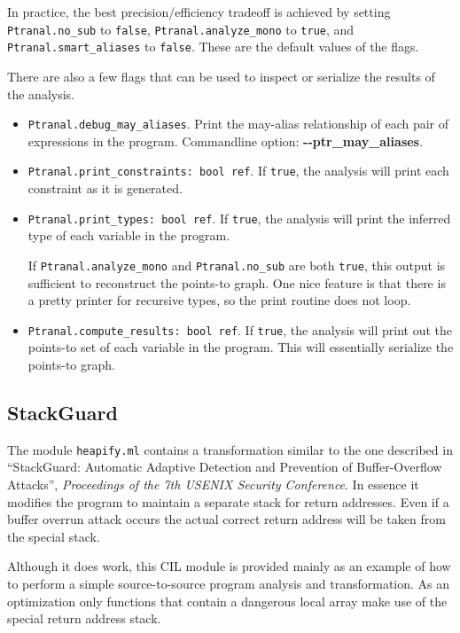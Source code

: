\documentclass{article}
\def\t#1{{\tt #1}}
\begin{document}
In practice, the best precision/efficiency tradeoff is achieved by
setting \t{Ptranal.no\_sub} to \t{false}, \t{Ptranal.analyze\_mono} to
\t{true}, and \t{Ptranal.smart\_aliases} to \t{false}.  These are the
default values of the flags.

There are also a few flags that can be used to inspect or serialize
the results of the analysis.
\begin{itemize}
\item \t{Ptranal.debug\_may\_aliases}.
  Print the may-alias relationship of each pair of expressions in the
  program.  Commandline option: {\bf -{}-ptr\_may\_aliases}.
\item \t{Ptranal.print\_constraints: bool ref}.
  If \t{true}, the analysis will print each constraint as it is
  generated.
\item \t{Ptranal.print\_types: bool ref}.
  If \t{true}, the analysis will print the inferred type of each
  variable in the program.

  If \t{Ptranal.analyze\_mono} and \t{Ptranal.no\_sub} are both
  \t{true}, this output is sufficient to reconstruct the points-to
  graph.  One nice feature is that there is a pretty printer for
  recursive types, so the print routine does not loop.
\item \t{Ptranal.compute\_results: bool ref}.
  If \t{true}, the analysis will print out the points-to set of each
  variable in the program.  This will essentially serialize the
  points-to graph.
\end{itemize}

\subsection{StackGuard}

The module \t{heapify.ml} contains a transformation similar to the one
described in ``StackGuard: Automatic Adaptive Detection and Prevention of
Buffer-Overflow Attacks'', {\em Proceedings of the 7th USENIX Security
Conference}. In essence it modifies the program to maintain a separate
stack for return addresses. Even if a buffer overrun attack occurs the
actual correct return address will be taken from the special stack. 

Although it does work, this CIL module is provided mainly as an example of
how to perform a simple source-to-source program analysis and
transformation. As an optimization only functions that contain a dangerous
local array make use of the special return address stack. 
\end{document}
